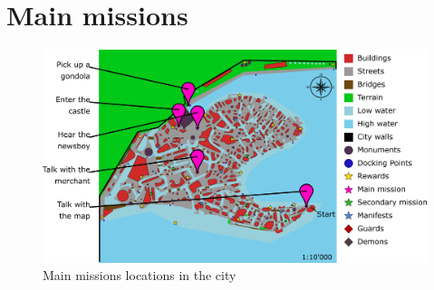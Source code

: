 \section{Main missions}
\begin{figure}[H]
  \centering
  \includegraphics[width=\textwidth]{Images/Maps/dynamiaMainMissions}
  \caption{Main missions locations in the city}
\end{figure}
\hspace{0pt} \\ %
